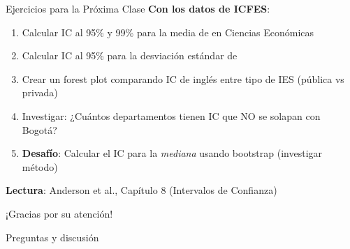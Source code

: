 \documentclass[aspectratio=169, 11pt]{beamer}
\begin{document}
\begin{frame}{Ejercicios para la Próxima Clase}
\textbf{Con los datos de ICFES}:
\begin{enumerate}
  \item Calcular IC al 95\% y 99\% para la media de  en Ciencias Econ\'omicas
  \item Calcular IC al 95\% para la desviación estándar de 
  \item Crear un forest plot comparando IC de inglés entre tipo de IES (pública vs privada)
  \item Investigar: ¿Cuántos departamentos tienen IC que NO se solapan con Bogotá?
  \item \textbf{Desafío}: Calcular el IC para la \emph{mediana} usando bootstrap (investigar método)
\end{enumerate}

\vspace{0.3cm}
\textbf{Lectura}: Anderson et al., Capítulo 8 (Intervalos de Confianza)
\end{frame}

\begin{frame}
\begin{center}
\Large
¡Gracias por su atención!

\vspace{1cm}
\normalsize
Preguntas y discusión
\end{center}
\end{frame}
\end{document}
